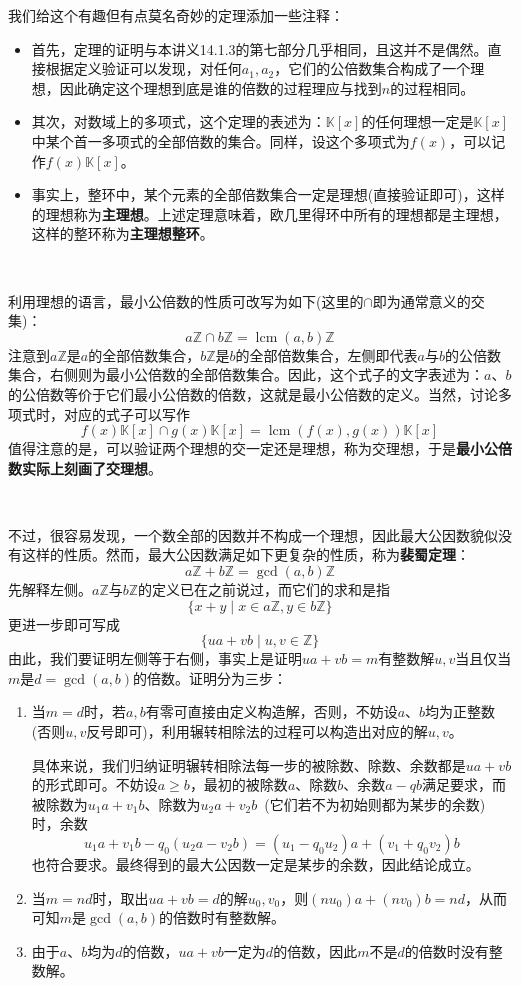 \documentclass[a4paper,UTF8,fontset=windows,AutoFakeBold]{ctexart}
\DeclareMathOperator{\lcm}{lcm}
\newcommand*{\note}{\noindent *}
\begin{document}
\note 我们给这个有趣但有点莫名奇妙的定理添加一些注释：
\begin{itemize}
    \item 首先，定理的证明与本讲义14.1.3的第七部分几乎相同，且这并不是偶然。直接根据定义验证可以发现，对任何$a_1,a_2$，它们的公倍数集合构成了一个理想，因此确定这个理想到底是谁的倍数的过程理应与找到$n$的过程相同。
    \item 其次，对数域上的多项式，这个定理的表述为：$\mathbb{K}[x]$的任何理想一定是$\mathbb{K}[x]$中某个首一多项式的全部倍数的集合。同样，设这个多项式为$f(x)$，可以记作$f(x)\mathbb{K}[x]$。
    \item 事实上，整环中，某个元素的全部倍数集合一定是理想(直接验证即可)，这样的理想称为\textbf{主理想}。上述定理意味着，欧几里得环中所有的理想都是主理想，这样的整环称为\textbf{主理想整环}。
\end{itemize}

\

利用理想的语言，最小公倍数的性质可改写为如下(这里的$\cap$即为通常意义的交集)：
$$a\mathbb{Z}\cap b\mathbb{Z}=\lcm(a,b)\mathbb{Z}$$
注意到$a\mathbb{Z}$是$a$的全部倍数集合，$b\mathbb{Z}$是$b$的全部倍数集合，左侧即代表$a$与$b$的公倍数集合，右侧则为最小公倍数的全部倍数集合。因此，这个式子的文字表述为：$a$、$b$的公倍数等价于它们最小公倍数的倍数，这就是最小公倍数的定义。当然，讨论多项式时，对应的式子可以写作
$$f(x)\mathbb{K}[x]\cap g(x)\mathbb{K}[x]=\lcm(f(x),g(x))\mathbb{K}[x]$$
值得注意的是，可以验证两个理想的交一定还是理想，称为交理想，于是\textbf{最小公倍数实际上刻画了交理想}。

\

不过，很容易发现，一个数全部的因数并不构成一个理想，因此最大公因数貌似没有这样的性质。然而，最大公因数满足如下更复杂的性质，称为\textbf{裴蜀定理}：
$$a\mathbb{Z}+b\mathbb{Z}=\gcd(a,b)\mathbb{Z}$$
先解释左侧。$a\mathbb{Z}$与$b\mathbb{Z}$的定义已在之前说过，而它们的求和是指
$$\{x+y\mid x\in a\mathbb{Z},y\in b\mathbb{Z}\}$$
更进一步即可写成
$$\{ua+vb\mid u,v\in\mathbb{Z}\}$$
由此，我们要证明左侧等于右侧，事实上是证明$ua+vb=m$有整数解$u,v$当且仅当$m$是$d=\gcd(a,b)$的倍数。证明分为三步：
\begin{enumerate}
    \item 当$m=d$时，若$a,b$有零可直接由定义构造解，否则，不妨设$a$、$b$均为正整数(否则$u,v$反号即可)，利用辗转相除法的过程可以构造出对应的解$u,v$。
    
    具体来说，我们归纳证明辗转相除法每一步的被除数、除数、余数都是$ua+vb$的形式即可。不妨设$a\ge b$，最初的被除数$a$、除数$b$、余数$a-qb$满足要求，而被除数为$u_1a+v_1b$、除数为$u_2a+v_2b$\ (它们若不为初始则都为某步的余数)时，余数
    $$u_1a+v_1b-q_0(u_2a-v_2b)=(u_1-q_0u_2)a+(v_1+q_0v_2)b$$
    也符合要求。最终得到的最大公因数一定是某步的余数，因此结论成立。

    \item 当$m=nd$时，取出$ua+vb=d$的解$u_0,v_0$，则$(nu_0)a+(nv_0)b=nd$，从而可知$m$是$\gcd(a,b)$的倍数时有整数解。
    
    \item 由于$a$、$b$均为$d$的倍数，$ua+vb$一定为$d$的倍数，因此$m$不是$d$的倍数时没有整数解。
\end{enumerate}
\end{document}
